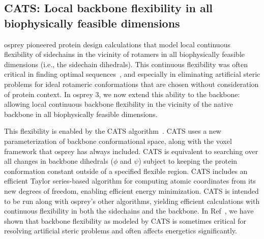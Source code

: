 \subsection{CATS: Local backbone flexibility in all biophysically feasible dimensions}

{\sc osprey} pioneered protein design calculations that model local continuous flexibility of sidechains in the vicinity of rotamers in all biophysically feasible dimensions (i.e., the sidechain dihedrals).  This continuous flexibility was often critical in finding optimal sequences~\cite{iMinDEE}, and especially in eliminating artificial steric problems for ideal rotameric conformations that are chosen without consideration of protein context.  In {\sc osprey} 3, we now extend this ability to the backbone: allowing local continuous backbone flexibility in the vicinity of the native backbone in all biophysically feasible dimensions.  

This flexibility is enabled by the CATS algorithm~\cite{CATS}.  CATS uses a new parameterization of backbone conformational space, along with the voxel framework that {\sc osprey} has always included.  CATS is equivalent to searching over all changes in backbone dihedrals ($\phi$ and $\psi$) subject to keeping the protein conformation constant outside of a specified flexible region. CATS includes an efficient Taylor series-based algorithm for computing atomic coordinates from its new degrees of freedom, enabling efficient energy minimization.  CATS is intended to be run along with {\sc osprey}'s other algorithms, yielding efficient calculations with continuous flexibility in both the sidechains and the backbone. In Ref~, we have shown that backbone flexibility as modeled by CATS is sometimes critical for resolving artificial steric problems and often affects energetics significantly.  